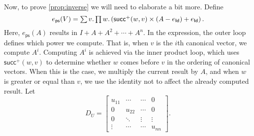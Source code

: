 Now, to prove \ref{prop:inverse} we will need to elaborate a bit more.
Define $$e_{\mathsf{ps}}(V)=\textstyle\sum v.\textstyle\prod w. \left( \mathsf{succ}^+(w,v)\times (A-e_{\mathsf{Id}}) + e_{\mathsf{Id}} \right).$$
Here, $e_{\mathsf{ps}}(A)$ results in $I+A+A^2+\cdots + A^n$. In the expression, the outer loop defines which power we compute. That is, when $v$ is the $i$th canonical vector, we compute $A^i$.
Computing $A^i$ is achieved via the inner product loop, which uses $\mathsf{succ}^+(w,v)$ to determine whether $w$ comes before $v$ in the ordering of canonical vectors.
When this is the case, we multiply the current result by $A$, and when $w$ is greater or equal than $v$, we use the identity not to affect the already computed result.
Let
\[
D_U = \begin{bmatrix}
    u_{11} & \cdots & \cdots &  0 \\
    0 & u_{22} & \cdots &  0 \\
    0 & \ddots & \vdots & \vdots \\
    \vdots & \cdots& \cdots & u_{nn}
\end{bmatrix}.
\]

